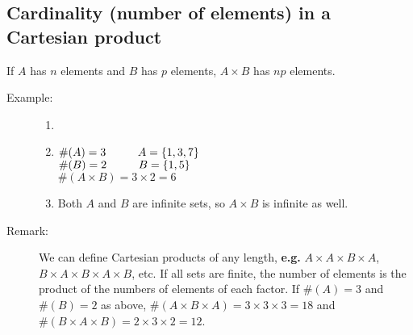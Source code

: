 \documentclass[10pt]{article}
\begin{document}
	\subsection{Cardinality (number of elements) in a Cartesian product}
	If $A$ has $n$ elements and $B$ has $p$ elements, $A \times B$ has $np$ elements.
	\pagebreak
	\begin{description}
		\item[Example:]
		\begin{enumerate}
			\item[]
			\item $ \#(A) = 3 \hspace{10mm} A = \{1, 3, 7\}$ \\
			$\#(B) = 2 \hspace{10mm} B = \{1, 5\}$ \\
			$\#(A \times B) = 3 \times 2 = 6$
			\item Both $A$ and $B$ are infinite sets, so $A \times B$ is infinite as well.
		\end{enumerate}
		\item[Remark:] We can define Cartesian products of any length, \textbf{e.g.} $A \times A \times B \times A$, $B \times A \times B \times A \times B$, etc. If all sets are finite, the number of elements is the product of the numbers of elements of each factor. If $\#(A) = 3$ and $\#(B) = 2$ as above, $\#(A \times B \times A) = 3 \times 3 \times 3 = 18$ and $\#(B \times A \times B) = 2 \times 3 \times 2 = 12$.
	\end{description}
	
\end{document}

